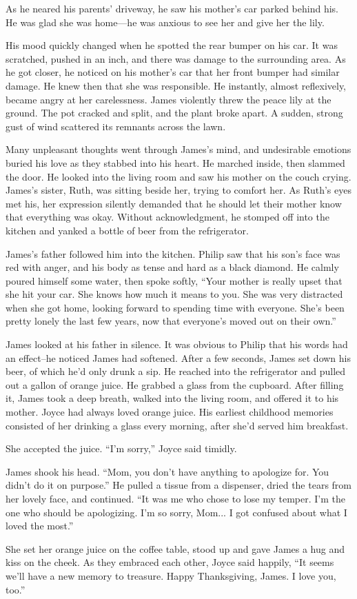 As he neared his parents' driveway, he saw his mother's car parked behind his. He was glad she was home—he was anxious to see her and give her the lily.

His mood quickly changed when he spotted the rear bumper on his car. It was scratched, pushed in an inch, and there was damage to the surrounding area. As he got closer, he noticed on his mother's car that her front bumper had similar damage. He knew then that she was responsible. He instantly, almost reflexively, became angry at her carelessness. James violently threw the peace lily at the ground. The pot cracked and split, and the plant broke apart. A sudden, strong gust of wind scattered its remnants across the lawn.

Many unpleasant thoughts went through James's mind, and undesirable emotions buried his love as they stabbed into his heart. He marched inside, then slammed the door. He looked into the living room and saw his mother on the couch crying. James's sister, Ruth, was sitting beside her, trying to comfort her. As Ruth's eyes met his, her expression silently demanded that he should let their mother know that everything was okay. Without acknowledgment, he stomped off into the kitchen and yanked a bottle of beer from the refrigerator.

James's father followed him into the kitchen. Philip saw that his son's face was red with anger, and his body as tense and hard as a black diamond. He calmly poured himself some water, then spoke softly,	“Your mother is really upset that she hit your car. She knows how much it means to you. She was very distracted when she got home, looking forward to spending time with everyone. She's been pretty lonely the last few years, now that everyone's moved out on their own.”

James looked at his father in silence. It was obvious to Philip that his words had an effect--he noticed James had softened. After a few seconds, James set down his beer, of which he'd only drunk a sip. He reached into the refrigerator and pulled out a gallon of orange juice. He grabbed a glass from the cupboard. After filling it, James took a deep breath, walked into the living room, and offered it to his mother. Joyce had always loved orange juice. His earliest childhood memories consisted of her drinking a glass every morning, after she'd served him breakfast.

She accepted the juice. “I'm sorry,” Joyce said timidly.

James shook his head. “Mom, you don't have anything to apologize for. You didn't do it on purpose.” He pulled a tissue from a dispenser, dried the tears from her lovely face, and continued. “It was me who chose to lose my temper. I'm the one who should be apologizing. I'm so sorry, Mom... I got confused about what I loved the most.”

She set her orange juice on the coffee table, stood up and gave James a hug and kiss on the cheek. As they embraced each other, Joyce said happily, “It seems we'll have a new memory to treasure. Happy Thanksgiving, James. I love you, too.”